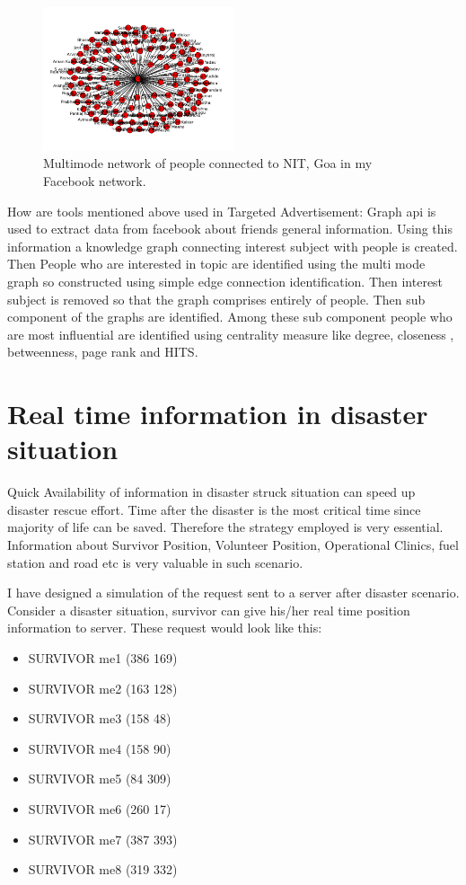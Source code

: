 \documentclass[AER]{AEA}
\begin{document}
\begin{figure}[h]
\caption{Multimode network of people connected to NIT, Goa in my Facebook network.}
\centering
\includegraphics[width=0.5\textwidth]{multimode_nitg}
\end{figure}

How are tools mentioned above used in Targeted Advertisement:
Graph api is used to extract data from facebook about friends general information. Using this information a knowledge graph connecting interest subject with people is created. Then People who are interested in topic are identified using the multi mode graph so constructed using simple edge connection identification. Then interest subject is removed so that the graph comprises entirely of people.  Then sub component of the graphs are identified. Among these sub component people who are most influential are identified using centrality measure like degree, closeness , betweenness, page rank and HITS. 

\section{Real time information in disaster situation}

Quick Availability of information in disaster struck situation can speed up disaster rescue effort. Time after the disaster is the most critical time since majority of life can be saved. Therefore the strategy employed is very essential. Information about Survivor Position, Volunteer Position, Operational Clinics,  fuel station and road etc is very valuable in such scenario. 

I have designed a simulation of the request sent to a server after disaster scenario. Consider a disaster situation, survivor can give his/her real time position information to server. These request would look like this:

\begin{itemize}
\item SURVIVOR me1 (386 169) 
\item SURVIVOR me2 (163 128) 
\item SURVIVOR me3 (158 48) 
\item SURVIVOR me4 (158 90) 
\item SURVIVOR me5 (84 309) 
\item SURVIVOR me6 (260 17) 
\item SURVIVOR me7 (387 393) 
\item SURVIVOR me8 (319 332) 
\end{itemize}
\end{document}
